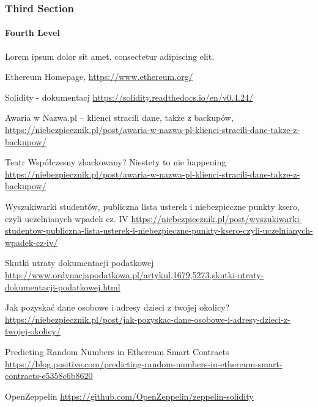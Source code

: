 \documentclass[]{llncs}
\begin{document}
\subsubsection{Third Section}
\paragraph{Fourth Level}
Lorem ipsum dolor sit amet, consectetur adipiscing elit.


%
%
%
% 
% 
%
\begin{thebibliography}{splncs04}
   Ethereum Homepage,
  \url{https://www.ethereum.org/}

   Solidity - dokumentacj
  \url{https://solidity.readthedocs.io/en/v0.4.24/}

   Awaria w Nazwa.pl – klienci stracili dane, także z backupów,
  \url{https://niebezpiecznik.pl/post/awaria-w-nazwa-pl-klienci-stracili-dane-takze-z-backupow/}

   Teatr Współczesny zhackowany? Niestety to nie happening
  \url{https://niebezpiecznik.pl/post/awaria-w-nazwa-pl-klienci-stracili-dane-takze-z-backupow/}

   Wyszukiwarki studentów, publiczna lista usterek i niebezpieczne punkty ksero, czyli uczelnianych wpadek cz. IV
  \url{https://niebezpiecznik.pl/post/wyszukiwarki-studentow-publiczna-lista-usterek-i-niebezpieczne-punkty-ksero-czyli-uczelnianych-wpadek-cz-iv/}

   Skutki utraty dokumentacji podatkowej
  \url{http://www.ordynacjapodatkowa.pl/artykul,1679,5273,skutki-utraty-dokumentacji-podatkowej.html}

   Jak pozyskać dane osobowe i adresy dzieci z twojej okolicy?
  \url{https://niebezpiecznik.pl/post/jak-pozyskac-dane-osobowe-i-adresy-dzieci-z-twojej-okolicy/}

   Predicting Random Numbers in Ethereum Smart Contracts
  \url{https://blog.positive.com/predicting-random-numbers-in-ethereum-smart-contracts-e5358c6b8620}

   OpenZeppelin
  \url{https://github.com/OpenZeppelin/zeppelin-solidity}

\end{thebibliography}
\end{document}

